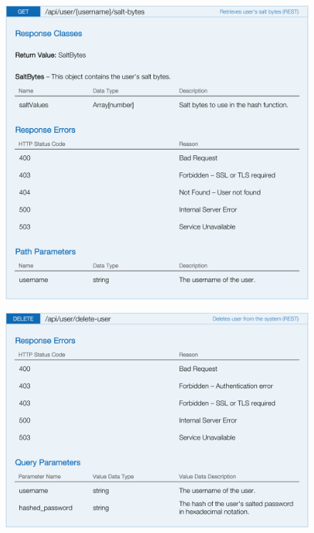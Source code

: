 \begin{figure}[H]
	\noindent
    	\centering
    	\includegraphics{apitables/APISaltBytes.png}
    	\label{fig:api-salt-bytes}
\end{figure}

\begin{figure}[H]
	\noindent
    	\centering
    	\includegraphics{apitables/APIDeleteUser.png}
    	\label{fig:api-delete-user}
\end{figure}

